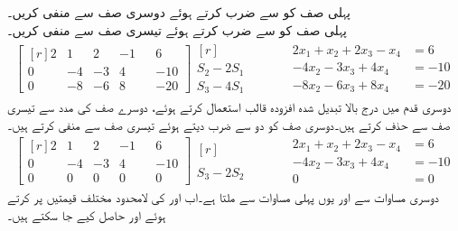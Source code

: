 پہلی صف کو  سے ضرب کرتے ہوئے دوسری صف سے منفی  کریں۔\\
پہلی صف کو  سے ضرب کرتے ہوئے تیسری صف سے منفی  کریں۔
\begin{gather*}
\begin{bmatrix*}[r]2&1&2&-1&&6\\0&-4&-3&4&&-10 \\0&-8&-6&8&&-20\end{bmatrix*}\begin{matrix*}[r]  \\S_2-2S_1\\S_3-4S_1  \end{matrix*}\quad\quad \quad
\begin{aligned}
2x_1+x_2+2x_3-x_4&=6\\
-4x_2-3x_3+4x_4&=-10\\
-8x_2-6x_3+8x_4&=-20
\end{aligned}
\end{gather*}
دوسری قدم میں درج بالا تبدیل شدہ افزودہ قالب استعمال کرتے ہوئے، دوسرے صف کی مدد سے تیسری صف سے  حذف کرتے ہیں۔دوسری صف کو دو سے ضرب دیتے ہوئے تیسری صف سے منفی کرتے ہیں۔
\begin{gather*}
\begin{bmatrix*}[r]2&1&2&-1&&6\\0&-4&-3&4&&-10 \\0&0&0&0&&0\end{bmatrix*}\begin{matrix*}[r]  \\\\S_3-2S_2  \end{matrix*}\quad\quad \quad
\begin{aligned}
2x_1+x_2+2x_3-x_4&=6\\
-4x_2-3x_3+4x_4&=-10\\
0&=0
\end{aligned}
\end{gather*}
دوسری مساوات سے  اور یوں پہلی مساوات سے  ملتا  ہے۔اب  اور  کی لامحدود مختلف قیمتیں پر کرتے ہوئے  اور  حاصل کیے جا سکتے ہیں۔

